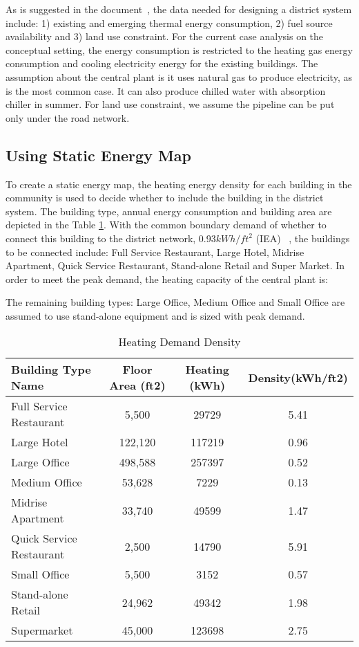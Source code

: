 \documentclass[hidelinks,12pt]{article}
\newcommand{\tref}[1]{Table \ref{#1}}
\begin{document}
As is suggested in the document~\cite{IDEA2012}, the data needed for
designing a district system include: 1) existing and emerging thermal
energy consumption, 2) fuel source availability and 3) land use
constraint. For the current case analysis on the conceptual setting,
the energy consumption is restricted to the heating gas energy
consumption and cooling electricity energy for the existing buildings.
The assumption about the central plant is it uses natural gas to
produce electricity, as is the most common case. It can also produce
chilled water with absorption chiller in summer. For land use
constraint, we assume the pipeline can be put only under the road
network.
 
\subsection{Using Static Energy Map}
To create a static energy map, the heating energy density for each
building in the community is used to decide whether to include the
building in the district system. The building type, annual energy
consumption and building area are depicted in the \tref{tab:heatDmd}.
With the common boundary demand of whether to connect this building to
the district network, 0.93$kWh/ft^2$ (IEA) ~\cite{IDEA2012}, the
buildings to be connected include: Full Service Restaurant, Large
Hotel, Midrise Apartment, Quick Service Restaurant, Stand-alone Retail
and Super Market. In order to meet the peak demand, the heating
capacity of the central plant is: 

The remaining building types: Large Office, Medium Office and Small
Office are assumed to use stand-alone equipment and is sized with peak
demand.

\begin{table}[h!]
  \centering
  \begin{tabular}{l|c|c|c}
    \hline
Building Type Name&  Floor Area (ft2)&Heating (kWh)&Density(kWh/ft2)\\
    \hline
Full Service Restaurant  &  5,500             & 29729   &5.41   \\
Large Hotel	         &  122,120	      & 117219  &0.96   \\
Large Office	         &  498,588	      & 257397  &0.52   \\
Medium Office	         &  53,628	      & 7229    &0.13   \\
Midrise Apartment        &  33,740	      & 49599   &1.47   \\
Quick Service Restaurant &  2,500          & 14790   &5.91   \\
Small Office	         &  5,500	      & 3152    &0.57   \\
Stand-alone Retail       &  24,962	      & 49342   &1.98   \\
Supermarket	         &  45,000	      & 123698  &2.75   \\
    \hline
\end{tabular}
\caption{Heating Demand Density}
\label{tab:heatDmd}
\end{table}
\end{document}

